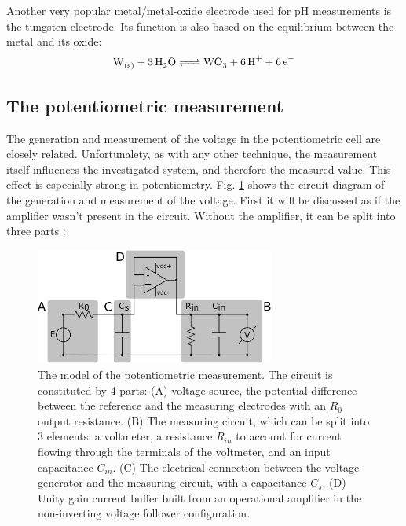 Another very popular metal/metal-oxide electrode used for pH measurements is the tungsten electrode. Its function is also based on the equilibrium between the metal and its oxide:
\begin{equation}
        \ce{W_{(s)} + 3H_2O <=> WO_3 + 6H^+ + 6e^-}
\end{equation}


		\subsection{The potentiometric measurement}
The generation and measurement of the voltage in the potentiometric cell are closely related.
Unfortunalety, as with any other technique, the measurement itself influences the investigated system, and therefore the measured value.
This effect is especially strong in potentiometry.
Fig. \ref{fig:loading_error} shows the circuit diagram of the generation and measurement of the voltage.
First it will be discussed as if the amplifier wasn't present in the circuit.
Without the amplifier, it can be split into three parts \cite{halliwell1987using}:

\begin{figure}
\centering
\includegraphics[width=0.7\textwidth]{img/theory/loading_error_2.eps}
\caption[The model of the potentiometric measurement.]{The model of the potentiometric measurement. The circuit is constituted by 4 parts: (A) voltage source, the potential difference between the reference and the measuring electrodes with an $R_0$ output resistance. (B) The measuring circuit, which can be split into 3 elements: a voltmeter, a resistance $R_{in}$ to account for current flowing through the terminals of the voltmeter, and an input capacitance $C_{in}$. (C) The electrical connection between the voltage generator and the measuring circuit, with a capacitance $C_s$. (D) Unity gain current buffer built from an operational amplifier in the non-inverting voltage follower configuration.}
\label{fig:loading_error}
\end{figure}

